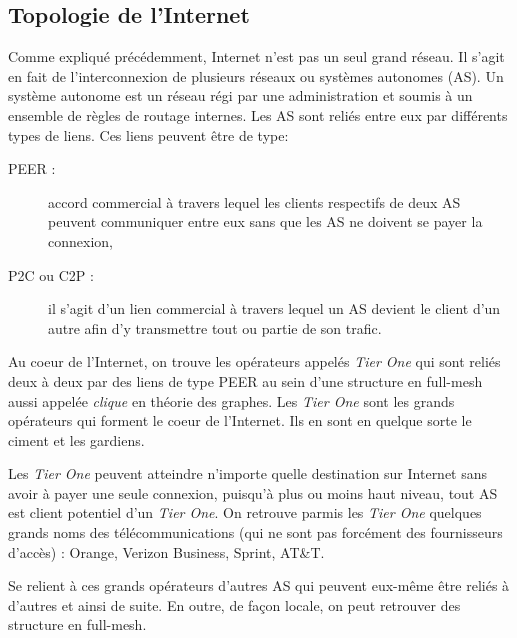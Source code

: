 

%

\subsection{Topologie de l'Internet}
\par
Comme expliqu\'e pr\'ec\'edemment, Internet n'est pas un seul grand r\'eseau. Il s'agit en fait de l'interconnexion de plusieurs r\'eseaux ou syst\`emes autonomes (AS). Un syst\`eme autonome est un r\'eseau r\'egi par une administration et soumis \`a un ensemble de r\`egles de routage internes. Les AS sont reli\'es entre eux par diff\'erents types de liens. Ces liens peuvent \^etre de type:
\begin{description}
 \item[PEER : ] accord commercial \`a travers lequel les clients respectifs de deux AS peuvent communiquer entre eux sans que les AS ne doivent se payer la connexion,
 \item[P2C ou C2P : ] il s'agit d'un lien commercial \`a travers lequel un AS devient le client d'un autre afin d'y transmettre tout ou partie de son trafic.
\end{description}
\par
Au coeur de l'Internet, on trouve les op\'erateurs appel\'es \textit{Tier One} qui sont reli\'es deux \`a deux par des liens de type PEER au sein d'une structure en full-mesh aussi appel\'ee \textit{clique} en th\'eorie des graphes. Les \textit{Tier One} sont les grands op\'erateurs qui forment le coeur de l'Internet. Ils en sont en quelque sorte le ciment et les gardiens. 
\par
 Les \textit{Tier One} peuvent atteindre n'importe quelle destination sur Internet sans avoir \`a payer une seule connexion, puisqu'\`a plus ou moins haut niveau, tout AS est client potentiel d'un \textit{Tier One}. On retrouve parmis les \textit{Tier One} quelques grands noms des télécommunications (qui ne sont pas forcément des fournisseurs d'acc\`es) : Orange, Verizon Business, Sprint, AT\&T.
\par
Se relient \`a ces grands op\'erateurs d'autres AS qui peuvent eux-m\^eme \^etre reli\'es \`a d'autres et ainsi de suite. En outre, de fa\c con locale, on peut retrouver des structure en full-mesh.

